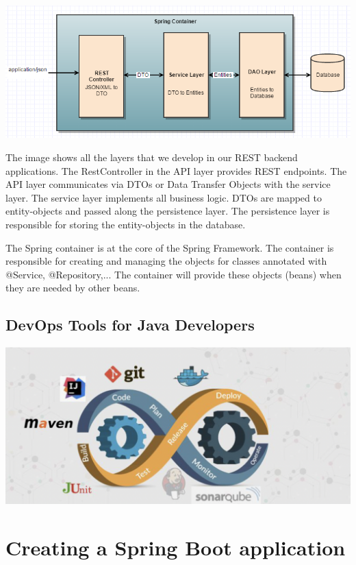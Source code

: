 \documentclass[a4paper, 12pt]{report}
\begin{document}
\includegraphics[width=\textwidth]{./images/Spring-REST-Web-Services.png} 

The image shows all the layers that we develop in our REST backend applications. The RestController in the API layer provides REST endpoints. The API layer communicates via DTOs or Data Transfer Objects with the service layer. The service layer implements all business logic. DTOs are mapped to entity-objects and passed along the persistence layer. The persistence layer is responsible for storing the entity-objects in the database.

The Spring container is at the core of the Spring Framework. The container is responsible for creating and managing the objects for classes annotated with @Service, @Repository,... The container will provide these objects (beans) when they are needed by other beans.


\section{DevOps Tools for Java Developers}

\includegraphics[width=\textwidth]{./images/chapter1/devops.png}  
 

\chapter{Creating a Spring Boot application}
\end{document}
